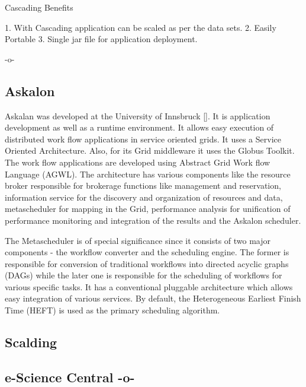 Cascading Benefits
    
1. With Cascading application can be scaled as per the data sets.
2. Easily Portable
3. Single jar file for application deployment.

    -o-

\subsection{Askalon}

Askalan was developed at the University of
Innsbruck [\cite{RMBDP-Book}].  It is application development as well as
a runtime environment. It allows easy execution of distributed work
flow applications in service oriented grids. It uses a Service
Oriented Architecture. Also, for its Grid middleware it uses the
Globus Toolkit. The work flow applications are developed using
Abstract Grid Work flow Language (AGWL). The architecture has various
components like the resource broker responsible for brokerage
functions like management and reservation, information service for the
discovery and organization of resources and data, metascheduler for
mapping in the Grid, performance analysis for unification of
performance monitoring and integration of the results and the Askalon
scheduler.

The Metascheduler is of special significance since it consists of two
major components - the workflow converter and the scheduling
engine. The former is responsible for conversion of traditional
workflows into directed acyclic graphs (DAGs) while the later one is
responsible for the scheduling of workflows for various specific
tasks. It has a conventional pluggable architecture which allows easy
integration of various services. By default, the Heterogeneous
Earliest Finish Time (HEFT) is used as the primary scheduling
algorithm.

\subsection{Scalding}

\subsection{e-Science Central -o-}

